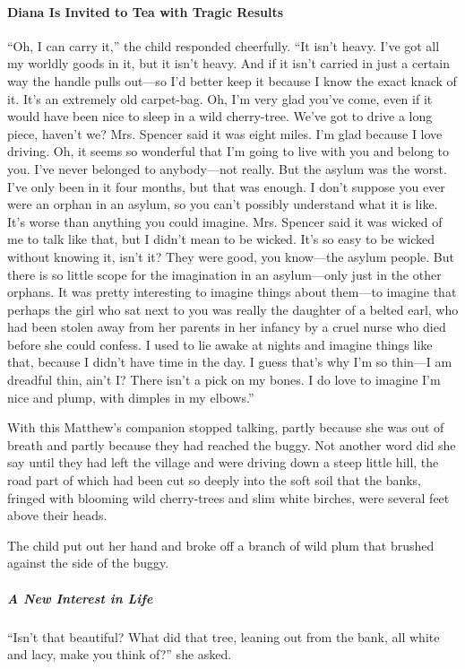 \documentclass{article}
\begin{document}
\paragraph{Diana Is Invited to Tea with Tragic Results}
``Oh, I can carry it,'' the child responded cheerfully. ``It isn't heavy. I've got all my worldly goods in it, but it isn't heavy. And if it isn't carried in just a certain way the handle pulls out---so I'd better keep it because I know the exact knack of it. It's an extremely old carpet-bag. Oh, I'm very glad you've come, even if it would have been nice to sleep in a wild cherry-tree. We've got to drive a long piece, haven't we? Mrs. Spencer said it was eight miles. I'm glad because I love driving. Oh, it seems so wonderful that I'm going to live with you and belong to you. I've never belonged to anybody---not really. But the asylum was the worst. I've only been in it four months, but that was enough. I don't suppose you ever were an orphan in an asylum, so you can't possibly understand what it is like. It's worse than anything you could imagine. Mrs. Spencer said it was wicked of me to talk like that, but I didn't mean to be wicked. It's so easy to be wicked without knowing it, isn't it? They were good, you know---the asylum people. But there is so little scope for the imagination in an asylum---only just in the other orphans. It was pretty interesting to imagine things about them---to imagine that perhaps the girl who sat next to you was really the daughter of a belted earl, who had been stolen away from her parents in her infancy by a cruel nurse who died before she could confess. I used to lie awake at nights and imagine things like that, because I didn't have time in the day. I guess that's why I'm so thin---I am dreadful thin, ain't I? There isn't a pick on my bones. I do love to imagine I'm nice and plump, with dimples in my elbows.''

With this Matthew's companion stopped talking, partly because she was out of breath and partly because they had reached the buggy. Not another word did she say until they had left the village and were driving down a steep little hill, the road part of which had been cut so deeply into the soft soil that the banks, fringed with blooming wild cherry-trees and slim white birches, were several feet above their heads.

The child put out her hand and broke off a branch of wild plum that brushed against the side of the buggy.

\subparagraph{A New Interest in Life}
``Isn't that beautiful? What did that tree, leaning out from the bank, all white and lacy, make you think of?'' she asked.
\end{document}

